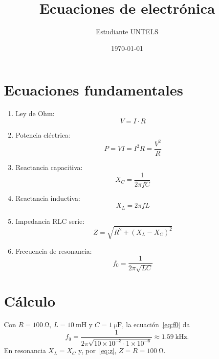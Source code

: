\documentclass[12pt,a4paper]{article}
\title{Ecuaciones de electrónica}
\author{Estudiante UNTELS}
\date{\today}
\begin{document}
\maketitle

\section{Ecuaciones fundamentales}
\begin{enumerate}
  \item Ley de Ohm:
    \begin{equation} V = I\cdot R \label{eq:ohm} \end{equation}
  \item Potencia eléctrica:
    \begin{equation} P = V I = I^{2}R = \frac{V^{2}}{R} \label{eq:potencia} \end{equation}
  \item Reactancia capacitiva:
    \begin{equation} X_C = \frac{1}{2\pi f C} \label{eq:xc} \end{equation}
  \item Reactancia inductiva:
    \begin{equation} X_L = 2\pi f L \label{eq:xl} \end{equation}
  \item Impedancia RLC serie:
    \begin{equation} Z = \sqrt{R^{2} + (X_L - X_C)^{2}} \label{eq:z} \end{equation}
  \item Frecuencia de resonancia:
    \begin{equation} f_0 = \frac{1}{2\pi\sqrt{LC}} \label{eq:f0} \end{equation}
\end{enumerate}

\section{Cálculo}
Con $R=\SI{100}{\ohm}$, $L=\SI{10}{\milli\henry}$ y $C=\SI{1}{\micro\farad}$,
la ecuación~\eqref{eq:f0} da
\[
  f_0 = \frac{1}{2\pi\sqrt{10\times10^{-3}\cdot 1\times10^{-6}}}
      \approx \SI{1,59}{\kilo\hertz}.
\]
En resonancia $X_L=X_C$ y, por~\eqref{eq:z}, $Z=R=\SI{100}{\ohm}$.
\end{document}
